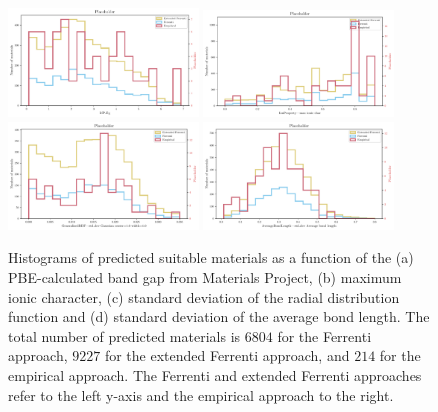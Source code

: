 \documentclass[superscriptaddress,unsortedaddress,
 amsmath,amssymb,
 aps,
]{revtex4-2}
\begin{document}
\begin{figure}[t]
    \includegraphics[width=0.45\textwidth]{figures/histograms/new/MP_Eg_count_075.pdf}
    \includegraphics[width=0.45\textwidth]{figures/histograms/new/IonProperty_max ionic char_count_075.pdf}
    \includegraphics[width=0.45\textwidth]{figures/histograms/new/GeneralizedRDF_std_dev Gaussian center=1.0 width=1.0_count_075.pdf}
    \includegraphics[width=0.45\textwidth]{figures/histograms/new/AverageBondLength_std_dev Average bond length_count_075.pdf}
    \caption{Histograms of predicted suitable materials as a function of the (a) PBE-calculated band gap from Materials Project, (b) maximum ionic character, (c) standard deviation of the radial distribution function and (d) standard deviation of the average bond length. The total number of predicted materials is  $6804$ for the Ferrenti approach, $9227$ for the extended Ferrenti approach, and $214$ for the empirical approach. The Ferrenti and extended Ferrenti approaches refer to the left y-axis and the empirical approach to the right.  }
    \label{fig:histogram_new}
\end{figure} 
\end{document}
